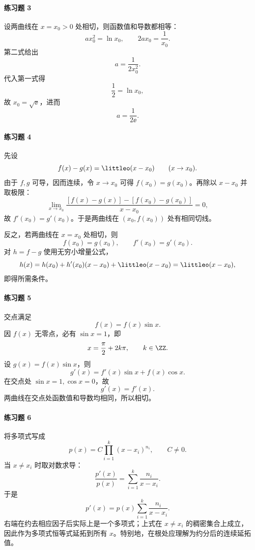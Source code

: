 \paragraph{练习题 3}
\begin{xsolution}
设两曲线在 $x=x_0>0$ 处相切，则函数值和导数都相等：
\[
  ax_0^2=\ln x_0,
  \qquad
  2ax_0=\frac1{x_0}.
\]
第二式给出
\[
  a=\frac1{2x_0^2}.
\]
代入第一式得
\[
  \frac12=\ln x_0,
\]
故 $x_0=\sqrt{\ee}$，进而
\[
  \boxed{a=\frac1{2\ee}}.
\]
\end{xsolution}

\paragraph{练习题 4}
\begin{xsolution}
先设
\[
  f(x)-g(x)=\littleo(x-x_0)\qquad(x\to x_0).
\]
由于 $f,g$ 可导，因而连续，令 $x\to x_0$ 可得 $f(x_0)=g(x_0)$。再除以 $x-x_0$ 并取极限：
\[
  \lim_{x\to x_0}\frac{[f(x)-g(x)]-[f(x_0)-g(x_0)]}{x-x_0}=0,
\]
故 $f'(x_0)=g'(x_0)$。于是两曲线在 $(x_0,f(x_0))$ 处有相同切线。

反之，若两曲线在 $x=x_0$ 处相切，则
\[
  f(x_0)=g(x_0),\qquad f'(x_0)=g'(x_0).
\]
对 $h=f-g$ 使用无穷小增量公式，
\[
  h(x)=h(x_0)+h'(x_0)(x-x_0)+\littleo(x-x_0)
  =\littleo(x-x_0),
\]
即得所需条件。
\end{xsolution}

\paragraph{练习题 5}
\begin{xsolution}
交点满足
\[
  f(x)=f(x)\sin x.
\]
因 $f(x)$ 无零点，必有 $\sin x=1$，即
\[
  x=\frac\pi2+2k\pi,\qquad k\in\ZZ.
\]
设 $g(x)=f(x)\sin x$，则
\[
  g'(x)=f'(x)\sin x+f(x)\cos x.
\]
在交点处 $\sin x=1,\cos x=0$，故
\[
  g'(x)=f'(x).
\]
两曲线在交点处函数值和导数均相同，所以相切。
\end{xsolution}

\paragraph{练习题 6}
\begin{xsolution}
将多项式写成
\[
  p(x)=C\prod_{i=1}^k(x-x_i)^{n_i},\qquad C\ne0.
\]
当 $x\ne x_i$ 时取对数求导：
\[
  \frac{p'(x)}{p(x)}=\sum_{i=1}^k\frac{n_i}{x-x_i}.
\]
于是
\[
  p'(x)=p(x)\sum_{i=1}^k\frac{n_i}{x-x_i}.
\]
右端在约去相应因子后实际上是一个多项式；上式在 $x\ne x_i$ 的稠密集合上成立，因此作为多项式恒等式延拓到所有 $x$。特别地，在根处应理解为约分后的连续延拓值。
\end{xsolution}

